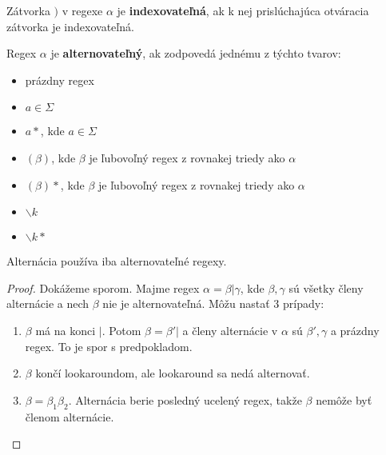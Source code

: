 \begin{df}
Zátvorka $)$ v regexe $\alpha$ je \textbf{indexovateľná}, ak k nej prislúchajúca otváracia zátvorka je indexovateľná.
\end{df}

\begin{df}
Regex $\alpha$ je \textbf{alternovateľný}, ak zodpovedá jednému z týchto tvarov:
\begin{itemize}
\item prázdny regex
\item $a\in\Sigma$ 
\item $a*$, kde $a\in\Sigma$
\item $(\beta)$, kde $\beta$ je ľubovoľný regex z rovnakej triedy ako $\alpha$
\item $(\beta)*$, kde $\beta$ je ľubovoľný regex z rovnakej triedy ako $\alpha$
\item $\backslash k$
\item $\backslash k *$
\end{itemize}
\end{df}

\begin{lema}
Alternácia používa iba alternovateľné regexy.
\end{lema}
\begin{proof}
Dokážeme sporom. Majme regex $\alpha = \beta | \gamma$, kde $\beta,\gamma$ sú všetky členy alternácie a nech $\beta$ nie je alternovateľná. Môžu nastať 3 prípady:
\begin{enumerate}
\setlength{\itemsep}{0cm}%
\setlength{\parskip}{0cm}%
\item $\beta$ má na konci $|$. Potom $\beta = \beta'|$ a členy alternácie v $\alpha$ sú $\beta', \gamma$ a prázdny regex. To je spor s predpokladom.
\item $\beta$ končí lookaroundom, ale lookaround sa nedá alternovať.
\item $\beta = \beta_1\beta_2$. Alternácia berie posledný ucelený regex, takže $\beta$ nemôže byť členom alternácie.
\end{enumerate}
\end{proof}

